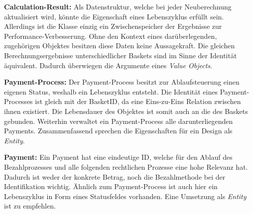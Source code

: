\textbf{Calculation-Result: } {Als Datenstruktur, welche bei jeder Neuberechnung aktualisiert wird, könnte die Eigenschaft eines Lebenszyklus erfüllt sein. Allerdings ist die Klasse einzig ein Zwischenspeicher der Ergebnisse zur Performance-Verbesserung. Ohne den Kontext eines darüberlegenden, zugehörigen Objektes besitzen diese Daten keine Aussagekraft. Die gleichen Berechnungsergebnisse unterschiedlicher Baskets sind im Sinne der Identität äquivalent. Dadurch überwiegen die Argumente eines \emph{Value Objects}.}

\textbf{Payment-Process: } {Der Payment-Process besitzt zur Ablaufsteuerung einen eigenen Status, weshalb ein Lebenszyklus entsteht. Die Identität eines Payment-Processes ist gleich mit der BasketID, da eine Eins-zu-Eins Relation zwischen ihnen existiert. Die Lebensdauer des Objektes ist somit auch an die des Baskets gebunden. Weiterhin verwaltet ein Payment-Process alle darunterliegenden Payments. Zusammenfassend sprechen die Eigenschaften für ein Design als \emph{Entity}.}

\textbf{Payment: } {Ein Payment hat eine eindeutige ID, welche für den Ablauf des Bezahlprozesses und alle folgenden rechtlichen Prozesse eine hohe Relevanz hat. Dadurch ist weder der konkrete Betrag, noch die Bezahlmethode bei der Identifikation wichtig. Ähnlich zum Payment-Process ist auch hier ein Lebenszyklus in Form eines Statusfeldes vorhanden. Eine Umsetzung als \emph{Entity} ist zu empfehlen.}



